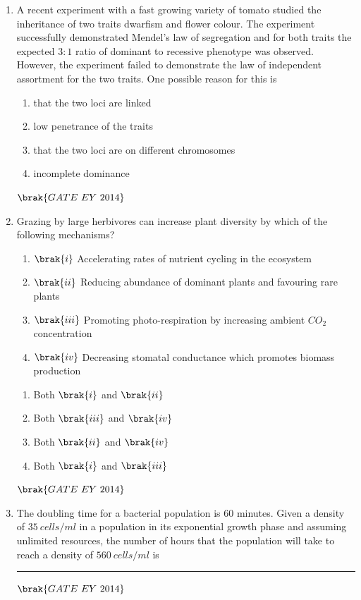 \documentclass[journal]{IEEEtran}
\numberwithin{equation}{enumi}
\numberwithin{figure}{enumi}
\begin{document}
\begin{enumerate}
    \item A recent experiment with a fast growing variety of tomato studied the inheritance of two traits dwarfism and flower colour. The experiment successfully demonstrated Mendel's law of segregation and for both traits the expected $3:1$ ratio of dominant to recessive phenotype was observed. However, the experiment failed to demonstrate the law of independent assortment for the two traits. One possible reason for this is
    \begin{multicols}{2}
    \begin{enumerate}
        \item that the two loci are linked
        \item low penetrance of the traits
        \item that the two loci are on different chromosomes
        \item incomplete dominance
    \end{enumerate}
    \end{multicols}
    \hfill{$\brak{ GATE\ EY\ 2014}$}
    \bigskip

    \item Grazing by large herbivores can increase plant diversity by which of the following mechanisms?
    \begin{enumerate}
        \item $\brak{i}$ Accelerating rates of nutrient cycling in the ecosystem
        \item $\brak{ii}$ Reducing abundance of dominant plants and favouring rare plants
        \item $\brak{iii}$ Promoting photo-respiration by increasing ambient $CO_{2}$ concentration
        \item $\brak{iv}$ Decreasing stomatal conductance which promotes biomass production
    \end{enumerate}
    \begin{multicols}{2}
    \begin{enumerate}
        \item Both $\brak{i}$ and $\brak{ii}$
        \item Both $\brak{iii}$ and $\brak{iv}$
        \item Both $\brak{ii}$ and $\brak{iv}$
        \item Both $\brak{i}$ and $\brak{iii}$
    \end{enumerate}
    \end{multicols}
    \hfill{$\brak{ GATE\ EY\ 2014}$}
    \bigskip

    \item The doubling time for a bacterial population is $60$ minutes. Given a density of $35~cells/ml$ in a population in its exponential growth phase and assuming unlimited resources, the number of hours that the population will take to reach a density of $560~cells/ml$ is \rule{3cm}{0.15mm}
    \hfill{$\brak{ GATE\ EY\ 2014}$}
    \bigskip

\end{enumerate}
\end{document}
